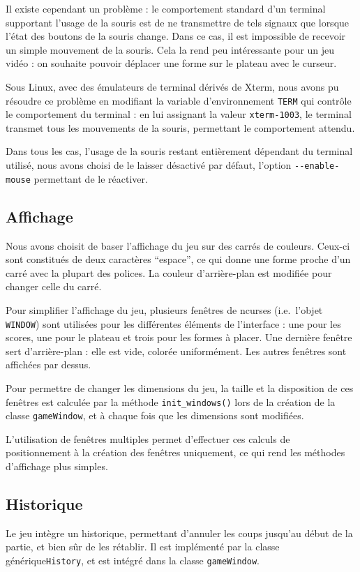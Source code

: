 \documentclass[11pt,a4paper]{article}
\begin{document}
Il existe cependant un problème : le comportement standard d'un terminal supportant l'usage de la souris est de ne transmettre de tels signaux que lorsque l'état des boutons de la souris change. Dans ce cas, il est impossible de recevoir un simple mouvement de la souris. Cela la rend peu intéressante pour un jeu vidéo : on souhaite pouvoir déplacer une forme sur le plateau avec le curseur.

Sous Linux, avec des émulateurs de terminal dérivés de Xterm, nous avons pu résoudre ce problème en modifiant la variable d'environnement \verb"TERM" qui contrôle le comportement du terminal : en lui assignant la valeur \verb"xterm-1003", le terminal transmet tous les mouvements de la souris, permettant le comportement attendu.

Dans tous les cas, l'usage de la souris restant entièrement dépendant du terminal utilisé, nous avons choisi de le laisser désactivé par défaut, l'option \verb"--enable-mouse" permettant de le réactiver.

\subsection{Affichage}
Nous avons choisit de baser l'affichage du jeu sur des carrés de couleurs. Ceux-ci sont constitués de deux caractères ``espace'', ce qui donne une forme proche d'un carré avec la plupart des polices. La couleur d'arrière-plan est modifiée pour changer celle du carré.

Pour simplifier l'affichage du jeu, plusieurs fenêtres de ncurses (i.e.\ l'objet \verb"WINDOW") sont utilisées pour les différentes éléments de l'interface : une pour les scores, une pour le plateau et trois pour les formes à placer. Une dernière fenêtre sert d'arrière-plan : elle est vide, colorée uniformément. Les autres fenêtres sont affichées par dessus.

Pour permettre de changer les dimensions du jeu, la taille et la disposition de ces fenêtres est calculée par la méthode \verb"init_windows()" lors de la création de la classe \verb"gameWindow", et à chaque fois que les dimensions sont modifiées.

L'utilisation de fenêtres multiples permet d'effectuer ces calculs de positionnement à la création des fenêtres uniquement, ce qui rend les méthodes d'affichage plus simples.


\subsection{Historique}
Le jeu intègre un historique, permettant d'annuler les coups jusqu'au début de la partie, et bien sûr de les rétablir. Il est implémenté par la classe générique\verb"History", et est intégré dans la classe \verb"gameWindow".
\end{document}
